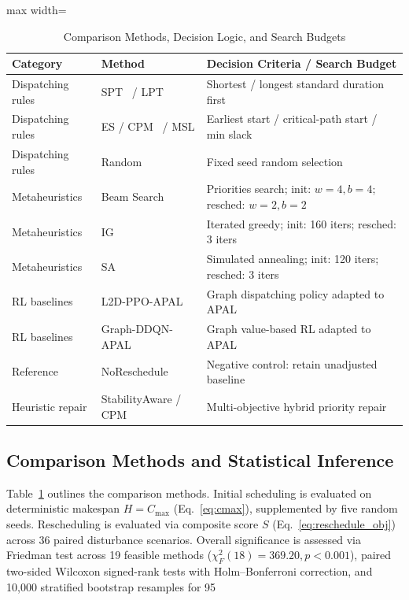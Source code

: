\documentclass[journal,10pt]{IEEEtran}
\renewcommand{\arraystretch}{0.98}
\begin{document}
\begin{table}[!t]
\centering
\caption{Comparison Methods, Decision Logic, and Search Budgets}
\label{tab:baselines}
\setlength{\tabcolsep}{3pt}
\renewcommand{\arraystretch}{0.98}
\begin{adjustbox}{max width=\columnwidth}
\begin{tabular}{@{}lll@{}}
\toprule
\textbf{Category} & \textbf{Method} & \textbf{Decision Criteria / Search Budget} \\
\midrule
Dispatching rules & SPT~\cite{smith1956} / LPT & Shortest / longest standard duration first \\
Dispatching rules & ES / CPM~\cite{kelley1961} / MSL & Earliest start / critical-path start / min slack \\
Dispatching rules & Random & Fixed seed random selection \\
Metaheuristics & Beam Search~\cite{ow1988} & Priorities search; init: $w=4, b=4$; resched: $w=2, b=2$ \\
Metaheuristics & IG~\cite{ruiz2007} & Iterated greedy; init: 160 iters; resched: 3 iters \\
Metaheuristics & SA~\cite{kirkpatrick1983} & Simulated annealing; init: 120 iters; resched: 3 iters \\
RL baselines & L2D-PPO-APAL & Graph dispatching policy adapted to APAL \\
RL baselines & Graph-DDQN-APAL & Graph value-based RL adapted to APAL \\
Reference & NoReschedule & Negative control: retain unadjusted baseline \\
Heuristic repair & StabilityAware / CPM & Multi-objective hybrid priority repair \\
\bottomrule
\end{tabular}
\end{adjustbox}
\end{table}

\subsection{Comparison Methods and Statistical Inference}

Table~\ref{tab:baselines} outlines the comparison methods. Initial scheduling is evaluated on deterministic makespan $H=C_{\max}$ (Eq.~\eqref{eq:cmax}), supplemented by five random seeds. Rescheduling is evaluated via composite score $S$ (Eq.~\eqref{eq:reschedule_obj}) across 36 paired disturbance scenarios. Overall significance is assessed via Friedman test across 19 feasible methods ($\chi_F^2(18)=369.20, p<0.001$), paired two-sided Wilcoxon signed-rank tests with Holm--Bonferroni correction, and 10,000 stratified bootstrap resamples for 95%
\end{document}
